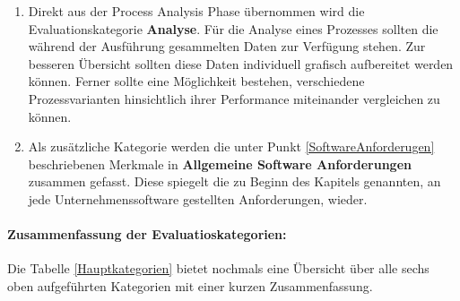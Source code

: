 \begin{enumerate}[label=\bfseries\arabic*]
\item Direkt aus der Process Analysis Phase übernommen wird die Evaluationskategorie \textbf{Analyse}. Für die Analyse eines Prozesses sollten die während der Ausführung gesammelten Daten zur Verfügung stehen. Zur besseren Übersicht sollten diese Daten individuell grafisch aufbereitet werden können. Ferner sollte eine Möglichkeit bestehen, verschiedene Prozessvarianten hinsichtlich ihrer Performance miteinander vergleichen zu können. 

\item Als zusätzliche Kategorie werden die unter Punkt \ref{SoftwareAnforderugen} beschriebenen Merkmale in \textbf{Allgemeine Software Anforderungen} zusammen gefasst. Diese spiegelt die zu Beginn des Kapitels genannten, an jede Unternehmenssoftware gestellten Anforderungen, wieder.

\end{enumerate}




\newpage
\paragraph*{Zusammenfassung der Evaluatioskategorien:}
\label{AnforderungenKategorien}
Die Tabelle \ref{Hauptkategorien} bietet nochmals eine Übersicht über alle sechs oben aufgeführten Kategorien mit einer kurzen Zusammenfassung.


